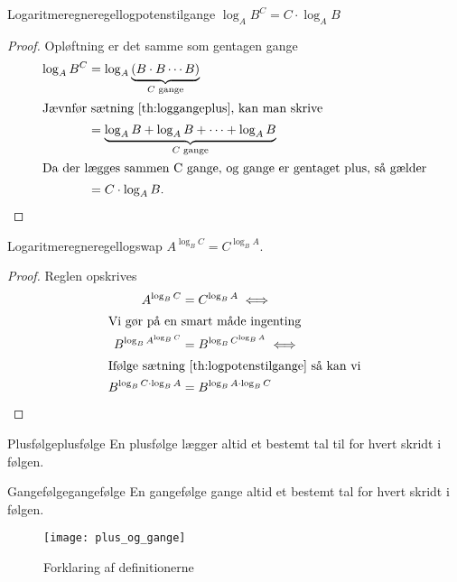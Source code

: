 \documentclass{article}
\begin{document}
\begin{theorem}{Logaritmeregneregel}{logpotenstilgange}
    $\log_AB^C = C \cdot \log_AB$
\end{theorem}

\begin{proof}
Opløftning er det samme som gentagen gange
\begin{align*}
    \log_AB^C &= \log_A{\underbrace{(B \cdot B \cdots B)}_{C\text{ gange}}}\\
\intertext{Jævnfør sætning \ref{th:loggangeplus}, kan man skrive}
              &= \underbrace{\log_A{B} + \log_A{B} + \cdots + \log_A{B}}_{C\text{ gange}}\\
\intertext{Da der lægges sammen C gange, og gange er gentaget plus, så gælder}
              &= C \cdot \log_AB.\qedhere
\end{align*}
\end{proof}

\begin{theorem}{Logaritmeregneregel}{logswap}
    $A^{\log_BC} = C^{\log_BA}$.
\end{theorem}

\begin{proof}
Reglen opskrives
\begin{align*}
    A^{\log_BC} &= C^{\log_BA} \iff\\
\intertext{Vi gør på en smart måde ingenting}
    B^{\log_B{A^{\log_BC}}} &= B^{\log_B{C^{\log_BA}}} \iff\\
\intertext{Ifølge sætning \ref{th:logpotenstilgange} så kan vi}
    B^{\log_BC \cdot \log_B{A}} &= B^{\log_BA \cdot \log_B{C}}\qedhere
\end{align*}
\end{proof}

\begin{definition}{Plusfølge}{plusfølge}
    En plusfølge lægger altid et bestemt tal til for hvert skridt i følgen.
\end{definition}

\begin{definition}{Gangefølge}{gangefølge}
    En gangefølge gange altid et bestemt tal for hvert skridt i følgen.
\end{definition}

\begin{figure}[H]
    \centering
    \caption{Forklaring af definitionerne}
    \texttt{[image: plus\_og\_gange]}
    \label{plus_og_gange}
\end{figure}
\end{document}
